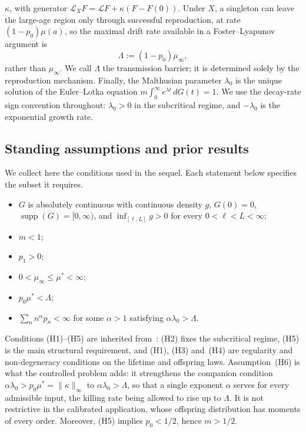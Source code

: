 \documentclass[letterpaper, 10pt, conference]{ieeeconf}
\newcommand{\Lbar}{\Lambda}
\newcommand{\rev}[1]{#1}
\newcommand{\pl}[1]{#1}
\begin{document}
$\kappa$, with generator
$\mathcal L_XF=\mathcal LF+\kappa(F-F(0))$. Under $X$, a singleton can leave the
large-age region only through successful reproduction, at rate $(1-p_0)\mu(a)$,
so the maximal drift rate available in a Foster--Lyapunov argument is
\begin{equation}
\Lbar:=(1-p_0)\mu_\infty,
\label{eq:barrier}
\end{equation}
rather than $\mu_\infty$. We call $\Lbar$ the transmission barrier; it is
determined solely by the reproduction mechanism. Finally, the Malthusian
parameter $\lambda_0$ is the unique solution of the Euler--Lotka equation
$m\int_0^\infty e^{\lambda t}\,dG(t)=1$.
\rev{We use the decay-rate sign convention throughout: $\lambda_0>0$ in the
subcritical regime, and $-\lambda_0$ is the exponential growth rate.}


\subsection{\rev{Standing assumptions and prior results}}\label{sec:background}
\rev{We collect here the conditions used in the sequel. Each statement
below specifies the subset it requires.}
\begin{itemize}[leftmargin=2.2em,itemsep=1pt]
\item[(H1)] $G$ is absolutely continuous with continuous density $g$,
$G(0)=0$, $\operatorname{supp}(G)=[0,\infty)$, and
$\inf_{[\ell,L]}g>0$ for every $0<\ell<L<\infty$;
\item[(H2)] $m<1$;
\item[(H3)] $p_1>0$;
\item[(H4)] $0<\mu_\infty\le\mu^\ast<\infty$;
\item[(H5)] $p_0\mu^\ast<\Lbar$;
\item[(\rev{H6})] $\sum_n n^\alpha p_n<\infty$ for some $\alpha>1$ satisfying
$\alpha\lambda_0>\Lbar$.
\end{itemize}
Conditions (H1)--(H5) are inherited from~\cite{companion}\rev{: (H2) fixes the
subcritical regime, (H5) is the \pl{main} structural requirement, and (H1),
(H3) and~(H4) are regularity and non-degeneracy conditions on the lifetime and
offspring laws. Assumption~(H6) is what the controlled problem adds:} it
strengthens the companion condition
$\alpha\lambda_0>p_0\mu^\ast=\|\kappa\|_\infty$ to $\alpha\lambda_0>\Lbar$,
so that a single exponent $\alpha$ serves for every admissible input, the
killing rate being allowed to rise up to $\Lbar$. It is not restrictive in the
calibrated application, whose offspring distribution has moments of every order.
Moreover, (H5) implies $p_0<1/2$, hence $m>1/2$.
\end{document}
